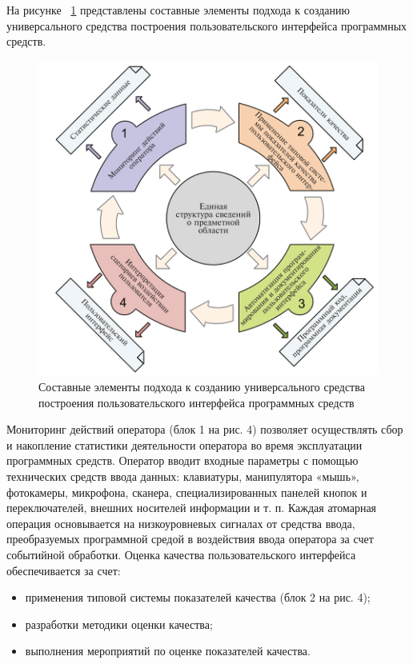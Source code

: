 \def\notedate{2022.10.15}
\def\currentauthor{Василян А.Р. (РК6-73Б)}

	На рисунке ~\ref{scheme1} представлены составные элементы подхода к созданию универсального средства построения пользовательского интерфейса программных средств.

\begin{figure}[!ht]
  \centering
  \includegraphics[scale=0.35]{ResearchNotes/rndhpc_not_gui_2022_10_15/scheme1.png}
  \caption{Составные элементы подхода к созданию универсального средства построения пользовательского интерфейса программных средств}
  \label{scheme1}
\end{figure}

	Мониторинг действий оператора (блок 1 на рис. 4) позволяет осуществлять сбор и накопление статистики деятельности оператора во время эксплуатации программных средств. Оператор вводит входные параметры с помощью технических средств ввода данных: клавиатуры, манипулятора «мышь», фотокамеры, микрофона, сканера, специализированных панелей кнопок и переключателей, внешних носителей информации и т. п. Каждая атомарная операция основывается на низкоуровневых сигналах от средства ввода, преобразуемых программной средой в воздействия ввода оператора за счет событийной обработки.
Оценка качества пользовательского интерфейса обеспечивается за счет:
\begin{itemize}
	\item применения типовой системы показателей качества (блок 2 на рис. 4);
	\item разработки методики оценки качества;
	\item выполнения мероприятий по оценке показателей качества.
\end{itemize}

